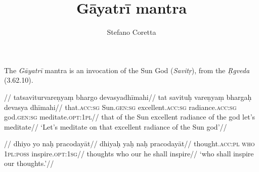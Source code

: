 \documentclass[a4paper,]{article}
\title{Gāyatrī mantra}
\author{Stefano Coretta}
\date{}
\newcommand\SC[1]{\textsc{#1}}
\begin{document}
\maketitle

The \emph{Gāyatrī} mantra is an invocation of the Sun God
(\emph{Savitṛ}), from the \emph{Ṛgveda} (3.62.10).

\ex \begingl {}//
\glpreamble tatsaviturvareṇyaṃ bhargo devasyadhīmahi//
\gla tat savituḥ vareṇyaṃ bhargaḥ devasya dhīmahi//
\glb that.\SC{acc:sg} Sun.\SC{gen:sg} excellent.\SC{acc:sg} radiance.\SC{acc:sg} god.\SC{gen:sg} meditate.\SC{opt:1pl}//
\glb that {of the Sun} excellent radiance {of the god} {let's meditate}//
\glft `Let's meditate on that excellent radiance of the Sun god'//
\endgl \xe

\ex \begingl {}//
\glpreamble dhiyo yo naḥ pracodayāt//
\gla dhiyaḥ yaḥ naḥ pracodayāt//
\glb thought.\SC{acc:pl} \SC{who} \SC{1pl:poss} inspire.\SC{opt:1sg}//
\glb thoughts who our {he shall inspire}//
\glft `who shall inspire our thoughts.'//
\endgl \xe
\end{document}
